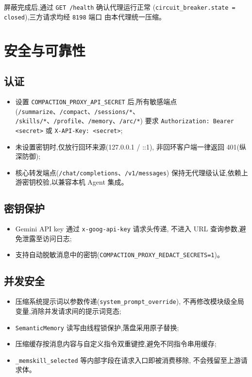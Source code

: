 \documentclass[11pt,a4paper]{article}
\begin{document}
屏蔽完成后,通过 \texttt{GET /health} 确认代理运行正常
(\texttt{circuit\_breaker.state = closed}),三方请求均经 \texttt{8198} 端口
由本代理统一压缩。

\section{安全与可靠性}

\subsection{认证}

\begin{itemize}
  \item 设置 \texttt{COMPACTION\_PROXY\_API\_SECRET} 后,所有敏感端点
        (\texttt{/summarize}、\texttt{/compact}、\texttt{/sessions/*}、
        \texttt{/skills/*}、\texttt{/profile}、\texttt{/memory}、\texttt{/arc/*})
        要求 \texttt{Authorization: Bearer <secret>} 或 \texttt{X-API-Key: <secret>};
  \item 未设置密钥时,仅放行回环来源(127.0.0.1 / ::1),
        非回环客户端一律返回 401(纵深防御);
  \item 核心转发端点(\texttt{/chat/completions}、\texttt{/v1/messages})
        保持无代理级认证,依赖上游密钥校验,以兼容本机 Agent 集成。
\end{itemize}

\subsection{密钥保护}

\begin{itemize}
  \item Gemini API key 通过 \texttt{x-goog-api-key} 请求头传递,
        不进入 URL 查询参数,避免泄露至访问日志;
  \item 支持自动脱敏消息中的密钥(\texttt{COMPACTION\_PROXY\_REDACT\_SECRETS=1})。
\end{itemize}

\subsection{并发安全}

\begin{itemize}
  \item 压缩系统提示词以参数传递(\texttt{system\_prompt\_override}),
        不再修改模块级全局变量,消除并发请求间的提示词竞态;
  \item \texttt{SemanticMemory} 读写由线程锁保护,落盘采用原子替换;
  \item 压缩缓存按消息内容与自定义指令双重键控,避免不同指令串用缓存;
  \item \texttt{\_memskill\_selected} 等内部字段在请求入口即被消费移除,
        不会残留至上游请求体。
\end{itemize}
\end{document}
